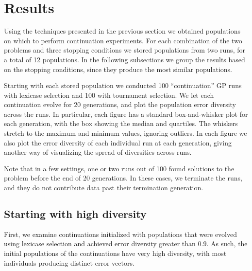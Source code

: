 \documentclass{sig-alternate-05-2015}
\begin{document}
\section{Results}
\label{sec:results}

Using the techniques presented in the previous section we obtained populations on which to perform continuation experiments. For each combination of the two problems and three stopping conditions we stored populations from two runs, for a total of 12 populations. In the following subsections we group the results based on the stopping conditions, since they produce the most similar populations.

Starting with each stored population we conducted 100 ``continuation'' GP runs with lexicase selection and 100 with tournament selection. We let each continuation evolve for 20 generations, and plot the population error diversity across the runs. In particular, each figure has a standard box-and-whisker plot for each generation, with the box showing the median and quartiles. The whiskers stretch to the maximum and minimum values, ignoring outliers. In each figure we also plot the error diversity of each individual run at each generation, giving another way of visualizing the spread of diversities across runs.

Note that in a few settings, one or two runs out of 100 found solutions to the problem before the end of 20 generations. In these cases, we terminate the runs, and they do not contribute data past their termination generation.



\subsection{Starting with high diversity}
\label{sec:highDiversityResults}

First, we examine continuations initialized with populations that were evolved using lexicase selection and achieved error diversity greater than $0.9$. As such, the initial populations of the continuations have very high diversity, with most individuals producing distinct error vectors.
\end{document}
